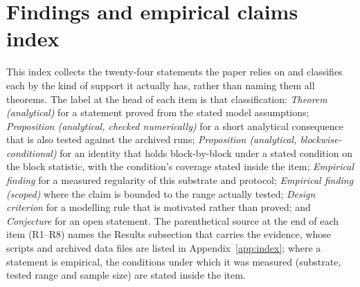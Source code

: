 \documentclass[preprint,12pt]{elsarticle}
\begin{document}
\appendix

\setcounter{table}{0}
\renewcommand{\thetable}{A\arabic{table}}

\section{Findings and empirical claims index}
\label{app:theorems}

This index collects the twenty-four statements the paper relies on and
classifies each by the kind of support it actually has, rather than naming
them all theorems. The label at the head of each item is that
classification: \emph{Theorem (analytical)} for a statement proved from the
stated model assumptions; \emph{Proposition (analytical, checked
numerically)} for a short analytical consequence that is also tested against
the archived runs; \emph{Proposition (analytical, blockwise-conditional)}
for an identity that holds block-by-block under a stated condition on the
block statistic, with the condition's coverage stated inside the item;
\emph{Empirical finding} for a measured regularity of
this substrate and protocol; \emph{Empirical finding (scoped)} where the claim
is bounded to the range actually tested; \emph{Design criterion} for a
modelling rule that is motivated rather than proved; and \emph{Conjecture}
for an open statement. The parenthetical source at the end of each item
(R1--R8) names the Results subsection that carries the evidence, whose scripts
and archived data files are listed in Appendix~\ref{app:index}; where a
statement is empirical, the conditions under which it was measured
(substrate, tested range and sample size) are stated inside the item.
\end{document}
